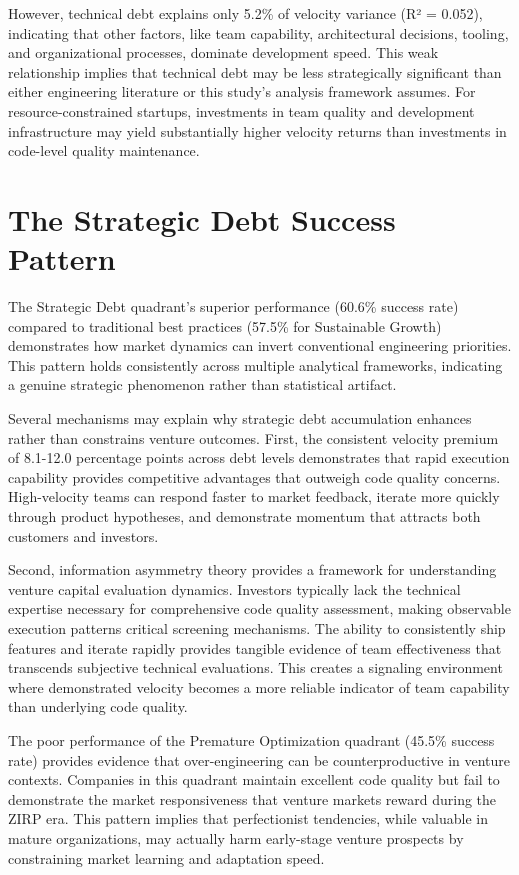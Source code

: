 However, technical debt explains only 5.2\% of velocity variance (R² = 0.052), indicating that other factors, like team capability, architectural decisions, tooling, and organizational processes, dominate development speed. This weak relationship implies that technical debt may be less strategically significant than either engineering literature or this study's analysis framework assumes. For resource-constrained startups, investments in team quality and development infrastructure may yield substantially higher velocity returns than investments in code-level quality maintenance.

\section{The Strategic Debt Success Pattern}

The Strategic Debt quadrant's superior performance (60.6\% success rate) compared to traditional best practices (57.5\% for Sustainable Growth) demonstrates how market dynamics can invert conventional engineering priorities. This pattern holds consistently across multiple analytical frameworks, indicating a genuine strategic phenomenon rather than statistical artifact.

Several mechanisms may explain why strategic debt accumulation enhances rather than constrains venture outcomes. First, the consistent velocity premium of 8.1-12.0 percentage points across debt levels demonstrates that rapid execution capability provides competitive advantages that outweigh code quality concerns. High-velocity teams can respond faster to market feedback, iterate more quickly through product hypotheses, and demonstrate momentum that attracts both customers and investors.

Second, information asymmetry theory \citep{spence1973job} provides a framework for understanding venture capital evaluation dynamics. Investors typically lack the technical expertise necessary for comprehensive code quality assessment, making observable execution patterns critical screening mechanisms. The ability to consistently ship features and iterate rapidly provides tangible evidence of team effectiveness that transcends subjective technical evaluations. This creates a signaling environment where demonstrated velocity becomes a more reliable indicator of team capability than underlying code quality.

The poor performance of the Premature Optimization quadrant (45.5\% success rate) provides evidence that over-engineering can be counterproductive in venture contexts. Companies in this quadrant maintain excellent code quality but fail to demonstrate the market responsiveness that venture markets reward during the \ac{ZIRP} era. This pattern implies that perfectionist tendencies, while valuable in mature organizations, may actually harm early-stage venture prospects by constraining market learning and adaptation speed.

